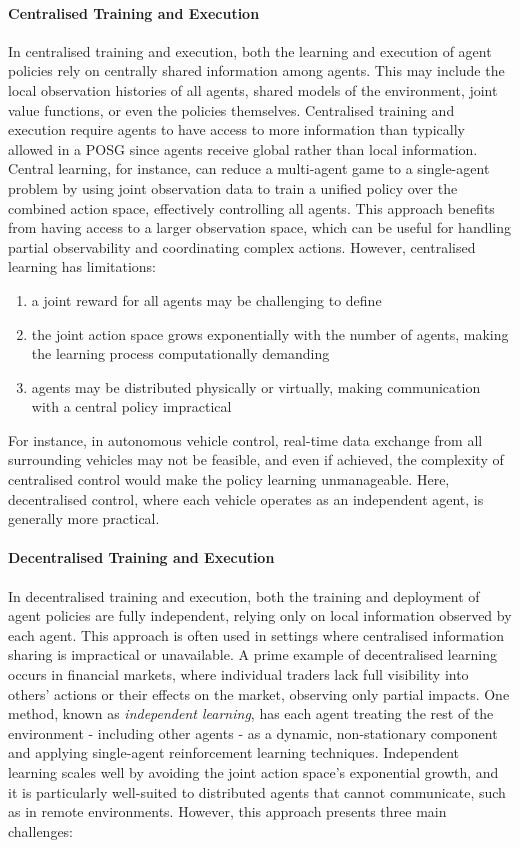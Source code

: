 \documentclass{article}
\begin{document}
\paragraph{Centralised Training and Execution} In centralised training and execution, both the learning and execution of agent policies rely on centrally shared information among agents. This may include the local observation histories of all agents, shared models of the environment, joint value functions, or even the policies themselves. Centralised training and execution require agents to have access to more information than typically allowed in a POSG since agents receive global rather than local information. Central learning, for instance, can reduce a multi-agent game to a single-agent problem by using joint observation data to train a unified policy over the combined action space, effectively controlling all agents. This approach benefits from having access to a larger observation space, which can be useful for handling partial observability and coordinating complex actions. However, centralised learning has limitations:

\begin{enumerate}
	\item a joint reward for all agents may be challenging to define
	\item the joint action space grows exponentially with the number of agents, making the learning process computationally demanding
	\item agents may be distributed physically or virtually, making communication with a central policy impractical
\end{enumerate}

For instance, in autonomous vehicle control, real-time data exchange from all surrounding vehicles may not be feasible, and even if achieved, the complexity of centralised control would make the policy learning unmanageable. Here, decentralised control, where each vehicle operates as an independent agent, is generally more practical.

\paragraph{Decentralised Training and Execution} In decentralised training and execution, both the training and deployment of agent policies are fully independent, relying only on local information observed by each agent. This approach is often used in settings where centralised information sharing is impractical or unavailable. A prime example of decentralised learning occurs in financial markets, where individual traders lack full visibility into others' actions or their effects on the market, observing only partial impacts. \citep{albrecht2024marl} One method, known as \textit{independent learning}, has each agent treating the rest of the environment - including other agents - as a dynamic, non-stationary component and applying single-agent reinforcement learning techniques. Independent learning scales well by avoiding the joint action space's exponential growth, and it is particularly well-suited to distributed agents that cannot communicate, such as in remote environments. However, this approach presents three main challenges:
\end{document}
